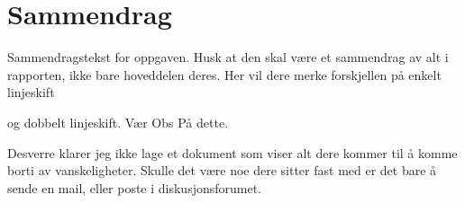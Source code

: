 \section*{Sammendrag}

Sammendragstekst for oppgaven. Husk at den skal være et sammendrag av alt i rapporten, 
ikke bare hoveddelen deres.
Her vil dere merke forskjellen på enkelt linjeskift 

og dobbelt linjeskift. Vær
Obs
På
dette.

Desverre klarer jeg ikke lage et dokument som viser alt dere kommer til å komme borti av vanskeligheter.
Skulle det være noe dere sitter fast med er det bare å sende en mail, eller poste i diskusjonsforumet.
